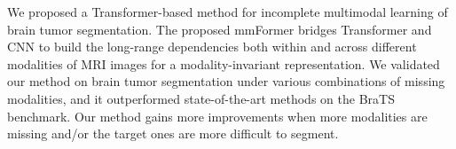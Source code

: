 \documentclass[runningheads]{llncs}
\begin{document}
We proposed a Transformer-based method for incomplete multimodal learning of brain tumor segmentation. The proposed mmFormer bridges Transformer and CNN to build the long-range dependencies both within and across different modalities of MRI images for a modality-invariant representation. We validated our method on brain tumor segmentation under various combinations of missing modalities, and it outperformed state-of-the-art methods on the BraTS benchmark. Our method gains more improvements when more modalities are missing and/or the target ones are more difficult to segment.





\end{document}
